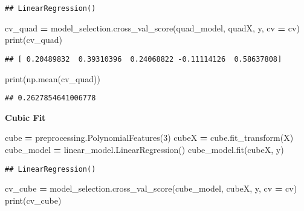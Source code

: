 \documentclass[
]{book}
\newenvironment{Shaded}{\begin{snugshade}}{\end{snugshade}}
\newcommand{\BuiltInTok}[1]{#1}
\newcommand{\DecValTok}[1]{\textcolor[rgb]{0.00,0.00,0.81}{#1}}
\newcommand{\NormalTok}[1]{#1}
\newcommand{\OperatorTok}[1]{\textcolor[rgb]{0.81,0.36,0.00}{\textbf{#1}}}
\begin{document}
\begin{verbatim}
## LinearRegression()
\end{verbatim}

\begin{Shaded}
\begin{Highlighting}[]
\NormalTok{cv\_quad }\OperatorTok{=}\NormalTok{ model\_selection.cross\_val\_score(quad\_model, quadX, y, cv }\OperatorTok{=}\NormalTok{ cv)}
\BuiltInTok{print}\NormalTok{(cv\_quad)}
\end{Highlighting}
\end{Shaded}

\begin{verbatim}
## [ 0.20489832  0.39310396  0.24068822 -0.11114126  0.58637808]
\end{verbatim}

\begin{Shaded}
\begin{Highlighting}[]
\BuiltInTok{print}\NormalTok{(np.mean(cv\_quad))}
\end{Highlighting}
\end{Shaded}

\begin{verbatim}
## 0.2627854641006778
\end{verbatim}

\textbf{Cubic Fit}

\begin{Shaded}
\begin{Highlighting}[]
\NormalTok{cube }\OperatorTok{=}\NormalTok{ preprocessing.PolynomialFeatures(}\DecValTok{3}\NormalTok{)}
\NormalTok{cubeX }\OperatorTok{=}\NormalTok{ cube.fit\_transform(X)}
\NormalTok{cube\_model }\OperatorTok{=}\NormalTok{ linear\_model.LinearRegression()}
\NormalTok{cube\_model.fit(cubeX, y)}
\end{Highlighting}
\end{Shaded}

\begin{verbatim}
## LinearRegression()
\end{verbatim}

\begin{Shaded}
\begin{Highlighting}[]
\NormalTok{cv\_cube }\OperatorTok{=}\NormalTok{ model\_selection.cross\_val\_score(cube\_model, cubeX, y, cv }\OperatorTok{=}\NormalTok{ cv)}
\BuiltInTok{print}\NormalTok{(cv\_cube)}
\end{Highlighting}
\end{Shaded}
\end{document}
